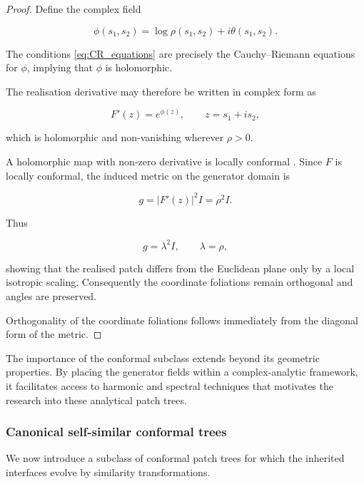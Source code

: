 \documentclass[11pt,a4paper]{article}
\begin{document}
\begin{proof}
Define the complex field

\[
\phi(s_1,s_2)
=
\log\rho(s_1,s_2)
+
i\theta(s_1,s_2).
\]

The conditions \eqref{eq:CR_equations} are precisely the
Cauchy--Riemann equations for $\phi$, implying that
$\phi$ is holomorphic.

The realisation derivative may therefore be written in
complex form as

\[
F'(z)=e^{\phi(z)},
\qquad z=s_1+i s_2,
\]

which is holomorphic and non-vanishing wherever
$\rho>0$.

A holomorphic map with non-zero derivative is locally conformal
\cite{ahlfors1979complex}. Since \(F\) is locally conformal, the induced metric on
the generator domain is

\[
g
=
|F'(z)|^2 I
=
\rho^2 I.
\]

Thus

\[
g=\lambda^2 I,
\qquad
\lambda=\rho,
\]

showing that the realised patch differs from the Euclidean
plane only by a local isotropic scaling. Consequently the
coordinate foliations remain orthogonal and angles are
preserved.

Orthogonality of the coordinate foliations follows
immediately from the diagonal form of the metric.
\end{proof}
The importance of the conformal subclass extends beyond its geometric
properties. By placing the generator fields within a complex-analytic
framework, it facilitates access to harmonic and spectral techniques that 
motivates the research into these analytical patch trees. 

\subsubsection{Canonical self-similar conformal trees}
\label{sec:conformal}

We now introduce a subclass of conformal patch trees for which the inherited 
interfaces evolve by similarity transformations.
\end{document}

